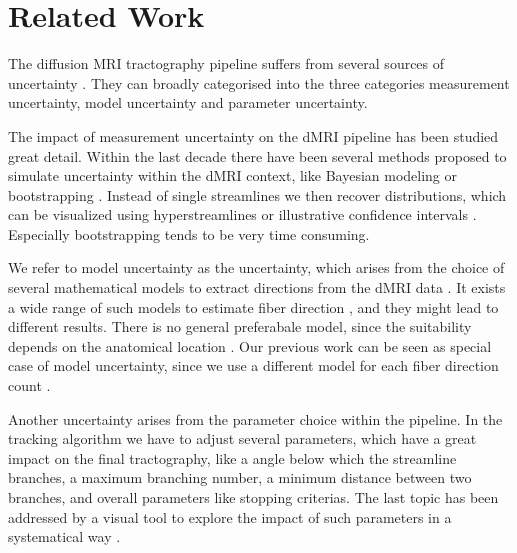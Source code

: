 \section{Related Work}\label{related}
The diffusion MRI tractography pipeline suffers from several sources of
uncertainty \cite{Schultz:SciVisBook2014, Schultz:NBM2018, Gillmann:STAR2021}.
They can broadly categorised into the three categories measurement uncertainty,
model uncertainty and parameter uncertainty. 

The impact of measurement
uncertainty on the dMRI pipeline has been studied great detail. Within the last
decade there have been several methods proposed to simulate uncertainty within
the dMRI context, like Bayesian modeling \cite{BEHRENS2007144} or bootstrapping
\cite{Chung:2006}. Instead of single streamlines we then recover distributions,
which can be visualized using hyperstreamlines \cite{Jeurissen:2012, Wiens:2014}
or illustrative confidence intervals \cite{Brecheisen:2013}. Especially
bootstrapping tends to be very time consuming.

We refer to model uncertainty as the uncertainty, which arises from the choice
of several mathematical models to extract directions from the dMRI data
\cite{Schultz:SciVisBook2014}. It exists a wide range of such models to estimate
fiber direction \cite{Panagiotaki:2012}, and they might lead to different
results. There is no general preferabale model, since the suitability depends  on
the anatomical location \cite{Bretthorst:2004,Freidlin:2007}. Our previous work
can be seen as special case of model uncertainty, since we use a different model
for each fiber direction count \cite{Gruen:2021}. 

Another uncertainty arises from the parameter choice within the pipeline. In the
tracking algorithm we have to adjust several parameters, which have a great
impact on the final tractography, like a angle below which the streamline
branches, a maximum branching number, a minimum distance between two branches,
and overall parameters like stopping criterias. The last topic has been addressed by a visual
tool to explore the impact of such parameters in a systematical way
\cite{Brecheisen:2009}.


